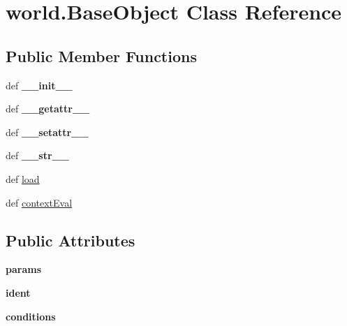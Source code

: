 \hypertarget{classworld_1_1_base_object}{\section{world.\-Base\-Object \-Class \-Reference}
\label{classworld_1_1_base_object}
}
\subsection*{\-Public \-Member \-Functions}
\begin{DoxyCompactItemize}
\item 
\hypertarget{classworld_1_1_base_object_a2e855c80dfc2c952edd876d1b10c9dfa}{def {\bfseries \-\_\-\-\_\-init\-\_\-\-\_\-}}\label{classworld_1_1_base_object_a2e855c80dfc2c952edd876d1b10c9dfa}

\item 
\hypertarget{classworld_1_1_base_object_acaebe544ee73eda0deecd24a4ee18a47}{def {\bfseries \-\_\-\-\_\-getattr\-\_\-\-\_\-}}\label{classworld_1_1_base_object_acaebe544ee73eda0deecd24a4ee18a47}

\item 
\hypertarget{classworld_1_1_base_object_a3d1982b8639ed550e69995389a120f0b}{def {\bfseries \-\_\-\-\_\-setattr\-\_\-\-\_\-}}\label{classworld_1_1_base_object_a3d1982b8639ed550e69995389a120f0b}

\item 
\hypertarget{classworld_1_1_base_object_a3e86b24df3755f351708aefb537bfefc}{def {\bfseries \-\_\-\-\_\-str\-\_\-\-\_\-}}\label{classworld_1_1_base_object_a3e86b24df3755f351708aefb537bfefc}

\item 
def \hyperlink{classworld_1_1_base_object_a933629183a0c136c1d455e733573498c}{load}
\item 
def \hyperlink{classworld_1_1_base_object_abd25e990a3bbf5bc3861e100dc83c027}{context\-Eval}
\end{DoxyCompactItemize}
\subsection*{\-Public \-Attributes}
\begin{DoxyCompactItemize}
\item 
\hypertarget{classworld_1_1_base_object_a2819ce8d01e8dde74dc1dd5927c89938}{{\bfseries params}}\label{classworld_1_1_base_object_a2819ce8d01e8dde74dc1dd5927c89938}

\item 
\hypertarget{classworld_1_1_base_object_a65875ade7c9541730d1a1e7a702d5ce6}{{\bfseries ident}}\label{classworld_1_1_base_object_a65875ade7c9541730d1a1e7a702d5ce6}

\item 
\hypertarget{classworld_1_1_base_object_ae6efb4dbfeb0cc66db81f55dda20d3dc}{{\bfseries conditions}}\label{classworld_1_1_base_object_ae6efb4dbfeb0cc66db81f55dda20d3dc}

\end{DoxyCompactItemize}
